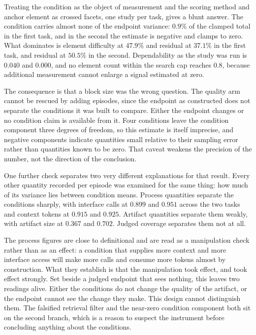\documentclass[11pt,a4paper]{article}
\begin{document}
Treating the condition as the object of measurement and the scoring method and anchor
element as crossed facets, one study per task, gives a blunt answer. The condition carries
almost none of the endpoint variance: $0.9\%$ of the clamped total in the first task, and
in the second the estimate is negative and clamps to zero. What dominates is element
difficulty at $47.9\%$ and residual at $37.1\%$ in the first task, and residual at $50.5\%$
in the second. Dependability as the study was run is $0.040$ and $0.000$, and no element
count within the search cap reaches $0.8$, because additional measurement cannot enlarge a
signal estimated at zero.

The consequence is that a block size was the wrong question. The quality arm cannot be
rescued by adding episodes, since the endpoint as constructed does not separate the
conditions it was built to compare. Either the endpoint changes or no condition claim is
available from it. Four conditions leave the condition component three degrees of freedom,
so this estimate is itself imprecise, and negative components indicate quantities small
relative to their sampling error rather than quantities known to be zero. That caveat
weakens the precision of the number, not the direction of the conclusion.

One further check separates two very different explanations for that result. Every other
quantity recorded per episode was examined for the same thing: how much of its variance
lies between condition means. Process quantities separate the conditions sharply, with
interface calls at $0.899$ and $0.951$ across the two tasks and context tokens at $0.915$
and $0.925$. Artifact quantities separate them weakly, with artifact size at $0.367$ and
$0.702$. Judged coverage separates them not at all.

The process figures are close to definitional and are read as a manipulation check rather
than as an effect: a condition that supplies more context and more interface access will
make more calls and consume more tokens almost by construction. What they establish is that
the manipulation took effect, and took effect strongly. Set beside a judged endpoint that
sees nothing, this leaves two readings alive. Either the conditions do not change the
quality of the artifact, or the endpoint cannot see the change they make. This design
cannot distinguish them. The falsified retrieval filter and the near-zero condition
component both sit on the second branch, which is a reason to suspect the instrument
before concluding anything about the conditions.
\end{document}
